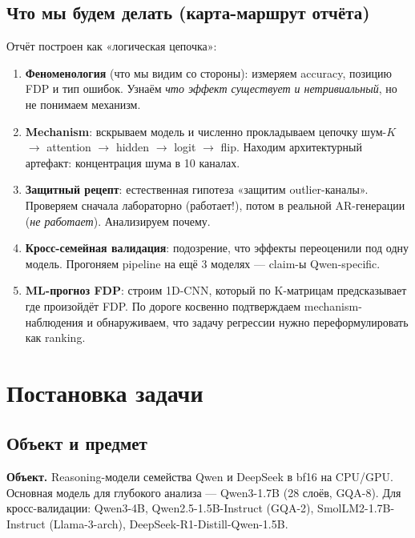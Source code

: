 \documentclass[a4paper,12pt]{article}
\begin{document}
\subsection{Что мы будем делать (карта-маршрут отчёта)}

Отчёт построен как «логическая цепочка»:

\begin{enumerate}[label=\textbf{Часть \arabic*:},leftmargin=2cm]
\item \textbf{Феноменология} (что мы видим со стороны): измеряем
  accuracy, позицию FDP и тип ошибок. Узнаём \textit{что эффект
  существует и нетривиальный}, но не понимаем механизм.
\item \textbf{Mechanism}: вскрываем модель и
  численно прокладываем цепочку шум-$K$ $\to$ attention $\to$ hidden
  $\to$ logit $\to$ flip. Находим архитектурный артефакт: концентрация
  шума в 10 каналах.
\item \textbf{Защитный рецепт}: естественная гипотеза «защитим
  outlier-каналы». Проверяем сначала лабораторно (работает!), потом в
  реальной AR-генерации (\textit{не работает}). Анализируем почему.
\item \textbf{Кросс-семейная валидация}: подозрение, что эффекты
  переоценили под одну модель. Прогоняем pipeline на ещё 3 моделях
  --- claim-ы Qwen-specific.
\item \textbf{ML-прогноз FDP}: строим 1D-CNN, который по K-матрицам
  предсказывает где произойдёт FDP. По дороге косвенно подтверждаем
  mechanism-наблюдения и обнаруживаем, что задачу регрессии нужно
  переформулировать как ranking.
\end{enumerate}

\section{Постановка задачи}

\subsection{Объект и предмет}

\textbf{Объект.} Reasoning-модели семейства Qwen и DeepSeek в bf16 на
CPU/GPU. Основная модель для глубокого анализа --- Qwen3-1.7B (28 слоёв,
GQA-8). Для кросс-валидации: Qwen3-4B, Qwen2.5-1.5B-Instruct (GQA-2),
SmolLM2-1.7B-Instruct (Llama-3-arch), DeepSeek-R1-Distill-Qwen-1.5B.
\end{document}
